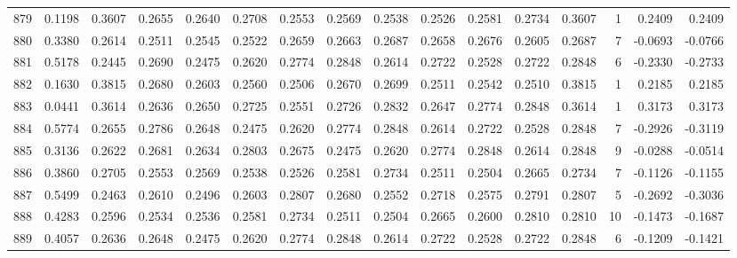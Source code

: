 \begin{tabular}{lrrrrrrrrrrrrrrr}
879 &      0.1198 &  0.3607 &  0.2655 &  0.2640 &  0.2708 &  0.2553 &  0.2569 &  0.2538 &  0.2526 &  0.2581 &   0.2734 &     0.3607 &      1 &                    0.2409 &                     0.2409 \\
880 &      0.3380 &  0.2614 &  0.2511 &  0.2545 &  0.2522 &  0.2659 &  0.2663 &  0.2687 &  0.2658 &  0.2676 &   0.2605 &     0.2687 &      7 &                   -0.0693 &                    -0.0766 \\
881 &      0.5178 &  0.2445 &  0.2690 &  0.2475 &  0.2620 &  0.2774 &  0.2848 &  0.2614 &  0.2722 &  0.2528 &   0.2722 &     0.2848 &      6 &                   -0.2330 &                    -0.2733 \\
882 &      0.1630 &  0.3815 &  0.2680 &  0.2603 &  0.2560 &  0.2506 &  0.2670 &  0.2699 &  0.2511 &  0.2542 &   0.2510 &     0.3815 &      1 &                    0.2185 &                     0.2185 \\
883 &      0.0441 &  0.3614 &  0.2636 &  0.2650 &  0.2725 &  0.2551 &  0.2726 &  0.2832 &  0.2647 &  0.2774 &   0.2848 &     0.3614 &      1 &                    0.3173 &                     0.3173 \\
884 &      0.5774 &  0.2655 &  0.2786 &  0.2648 &  0.2475 &  0.2620 &  0.2774 &  0.2848 &  0.2614 &  0.2722 &   0.2528 &     0.2848 &      7 &                   -0.2926 &                    -0.3119 \\
885 &      0.3136 &  0.2622 &  0.2681 &  0.2634 &  0.2803 &  0.2675 &  0.2475 &  0.2620 &  0.2774 &  0.2848 &   0.2614 &     0.2848 &      9 &                   -0.0288 &                    -0.0514 \\
886 &      0.3860 &  0.2705 &  0.2553 &  0.2569 &  0.2538 &  0.2526 &  0.2581 &  0.2734 &  0.2511 &  0.2504 &   0.2665 &     0.2734 &      7 &                   -0.1126 &                    -0.1155 \\
887 &      0.5499 &  0.2463 &  0.2610 &  0.2496 &  0.2603 &  0.2807 &  0.2680 &  0.2552 &  0.2718 &  0.2575 &   0.2791 &     0.2807 &      5 &                   -0.2692 &                    -0.3036 \\
888 &      0.4283 &  0.2596 &  0.2534 &  0.2536 &  0.2581 &  0.2734 &  0.2511 &  0.2504 &  0.2665 &  0.2600 &   0.2810 &     0.2810 &     10 &                   -0.1473 &                    -0.1687 \\
889 &      0.4057 &  0.2636 &  0.2648 &  0.2475 &  0.2620 &  0.2774 &  0.2848 &  0.2614 &  0.2722 &  0.2528 &   0.2722 &     0.2848 &      6 &                   -0.1209 &                    -0.1421 \\

\end{tabular}
